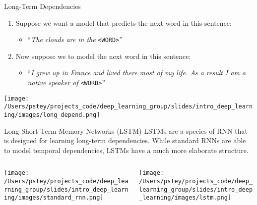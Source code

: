\documentclass[pdf]{beamer}
\begin{document}
	
	
	
	\begin{frame}{Long-Term Dependencies}
	\begin{enumerate}
		
		\item Suppose we want a model that predicts the next word in this sentence: 
		\begin{itemize}
			\item ``\textit{The clouds are in the} \texttt{<WORD>}''
		\end{itemize}
		\vspace{2em}
		
		\item Now suppose we to model the next word in this sentence: 
		\begin{itemize}
			\item ``\textit{I grew up in France and lived there most of my life. As a result I am a native speaker of} \texttt{<WORD>}''
		\end{itemize}
	\end{enumerate}
	
	\begin{center}
		\texttt{[image: /Users/pstey/projects\_code/deep\_learning\_group/slides/intro\_deep\_learning/images/long\_depend.png]}
	\end{center}
	\end{frame}

	\begin{frame}{Long Short Term Memory Networks (LSTM)}
		LSTMs are a species of RNN that is designed for learning long-term dependencies. While standard RNNs are able to model temporal dependencies, LSTMs have a much more elaborate structure.
		
	\begin{columns}
	\begin{column}{0.5\textwidth}
	\begin{center}
		\vspace{-4em}
		\texttt{[image: /Users/pstey/projects\_code/deep\_learning\_group/slides/intro\_deep\_learning/images/standard\_rnn.png]}
	\end{center}
	\end{column}
	
	\begin{column}{0.5\textwidth}
	\begin{center}
		\vspace{7em}
		\texttt{[image: /Users/pstey/projects\_code/deep\_learning\_group/slides/intro\_deep\_learning/images/lstm.png]}
	\end{center}
	\end{column}
	\end{columns}
	\end{frame}
\end{document}
